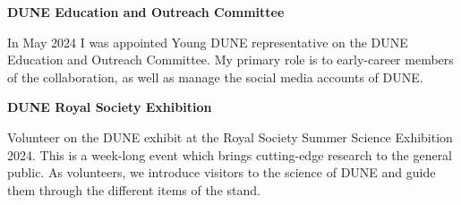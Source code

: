 		{%
		\hfill}
		{%
			\textbf{DUNE Education and Outreach Committee}}
		{%
			\begin{justify}\noindent
				In May 2024 I was appointed Young DUNE representative on the DUNE Education and Outreach Committee. My primary role is to early-career members of the collaboration, as well as manage the social media accounts of DUNE.
			\end{justify}
		}

		{%
		\hfill}
		{%
			\textbf{DUNE Royal Society Exhibition}}
		{%
			\begin{justify}\noindent
				Volunteer on the DUNE exhibit at the Royal Society Summer Science Exhibition 2024. This is a week-long event which brings cutting-edge research to the general public. As volunteers, we introduce visitors to the science of DUNE and guide them through the different items of the stand.
			\end{justify}
		}